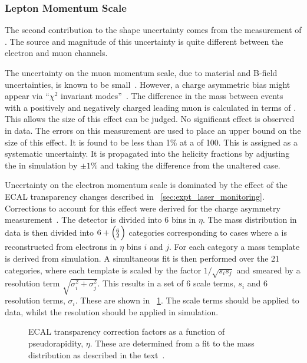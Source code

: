 \subsubsection{Lepton Momentum Scale}
The second contribution to the \LP shape uncertainty comes from the measurement
of \Ptl. The source and magnitude of this uncertainty is quite different between
the electron and muon channels.

The uncertainty on the muon momentum scale, due to material and B-field
uncertainties, is known to be small~\cite{mu_align_pas}. However, a charge
asymmetric \Pt bias might appear via ``$\chi^2$ invariant modes''~\cite[section
2.4]{matthias_edelhoff_thesis}. The difference in the \PZ mass between events
with a positively and negatively charged leading muon is calculated in terms of
\Ptl. This allows the size of this effect can be judged. No significant effect
is observed in data. The errors on this measurement are used to place an upper
bound on the size of this effect. It is found to be less than 1\% at a \Ptmu of
\unit{100}{\GeV}. This is assigned as a systematic uncertainty. It is propagated
into the helicity fractions by adjusting the \Ptmu in simulation by $\pm 1\%$
and taking the difference from the unaltered case.

Uncertainty on the electron momentum scale is dominated by the effect of the
\ac{ECAL} transparency changes described in
\sec~\ref{sec:expt_laser_monitoring}. Corrections to account for this effect
were derived for the \PW charge asymmetry
measurement~\cite{w_charge_asymmetry}. The detector is divided into 6 bins in
$\eta$. The \Zee mass distribution in data is then divided into $6+\Bigl(\negthinspace\begin{smallmatrix}6\\2\end{smallmatrix}\Bigr)$
categories corresponding to cases where a \PZ is reconstructed from electrons in
$\eta$ bins $i$ and $j$.  For each category a mass template is derived from
simulation. A simultaneous fit is then performed over the 21 categories, where
each template is scaled by the factor $1/\sqrt{s_is_j}$ and smeared by a
resolution term $\sqrt{\sigma_i^2 + \sigma_j^2}$. This results in a set of 6
scale terms, $s_i$ and 6 resolution terms, $\sigma_i$. These are shown in
\fig~\ref{fig:wpol_ecal_transp_corr}.  The scale terms should be applied to
data, whilst the resolution should be applied in simulation.

\begin{figure}[h!]
  \centering
  \quad
  \quad
  \caption[\acs{ECAL} transparency correction factors as a function of
  $\eta$]{\ac{ECAL} transparency correction factors as a function of
    pseudorapidity, $\eta$. These are determined from a fit to the \PZ mass distribution
    as described in the text~\cite{w_charge_asymmetry_an}.}
\label{fig:wpol_ecal_transp_corr}
\end{figure}

